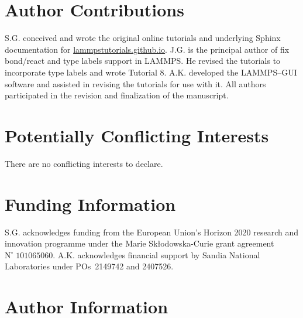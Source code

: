 \documentclass[9pt,tutorial]{livecoms}
\newcommand{\lmpcmd}[1]{\hspace{0pt}\colorbox{listing}{\textcolor{command}{\small{#1}}}\hspace{0pt}} %
\begin{document}
\section*{Author Contributions}

S.G. conceived and wrote the original online tutorials and underlying Sphinx documentation
for \href{https://lammpstutorials.github.io}{lammpstutorials.github.io}.
J.G. is the principal author of \lmpcmd{fix bond/react} and \lmpcmd{type labels}
support in LAMMPS.  He revised the tutorials to incorporate type labels and wrote Tutorial 8.
A.K. developed the LAMMPS--GUI software and assisted in revising the
tutorials for use with it.  All authors participated in the revision and finalization
of the manuscript.

\section*{Potentially Conflicting Interests}

There are no conflicting interests to declare.

\section*{Funding Information}

S.G. acknowledges funding from the European Union's Horizon 2020 research and
innovation programme under the Marie Skłodowska-Curie grant agreement $\text{N}^\circ\;101065060$.
A.K. acknowledges financial support by Sandia National Laboratories under
POs~2149742 and 2407526.

\section*{Author Information}
\makeorcid



\end{document}

